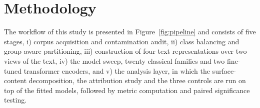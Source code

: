 \documentclass[conference,a4paper]{IEEEtran}
\begin{document}



\section{Methodology}
\label{sec:method}

The workflow of this study is presented in Figure~\ref{fig:pipeline} and consists of five stages, i) corpus acquisition and contamination audit, ii) class balancing and group-aware partitioning, iii) construction of four text representations over two views of the text, iv) the model sweep, twenty classical families and two fine-tuned transformer encoders, and v) the analysis layer, in which the surface-content decomposition, the attribution study and the three controls are run on top of the fitted models, followed by metric computation and paired significance testing.
\end{document}
